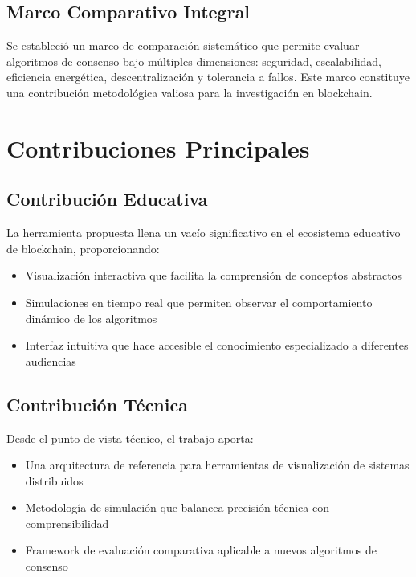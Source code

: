 \documentclass[spanish,12pt,letterpaper]{report}
\begin{document}
\subsection{Marco Comparativo Integral}

Se estableció un marco de comparación sistemático que permite evaluar algoritmos de consenso bajo múltiples dimensiones: seguridad, escalabilidad, eficiencia energética, descentralización y tolerancia a fallos. Este marco constituye una contribución metodológica valiosa para la investigación en blockchain.

\section{Contribuciones Principales}

\subsection{Contribución Educativa}

La herramienta propuesta llena un vacío significativo en el ecosistema educativo de blockchain, proporcionando:

\begin{itemize}
    \item Visualización interactiva que facilita la comprensión de conceptos abstractos
    \item Simulaciones en tiempo real que permiten observar el comportamiento dinámico de los algoritmos
    \item Interfaz intuitiva que hace accesible el conocimiento especializado a diferentes audiencias
\end{itemize}

\subsection{Contribución Técnica}

Desde el punto de vista técnico, el trabajo aporta:

\begin{itemize}
    \item Una arquitectura de referencia para herramientas de visualización de sistemas distribuidos
    \item Metodología de simulación que balancea precisión técnica con comprensibilidad
    \item Framework de evaluación comparativa aplicable a nuevos algoritmos de consenso
\end{itemize}
\end{document}
